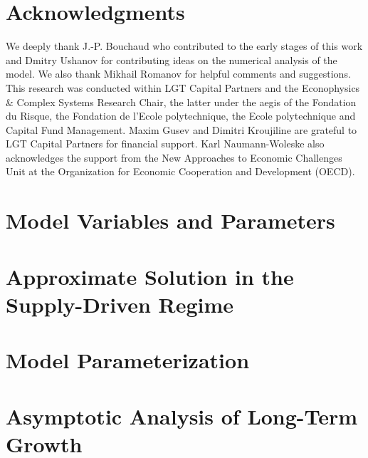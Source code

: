 \documentclass[authoryear, review]{elsarticle}
\begin{document}
\section{Acknowledgments}
\label{sec_ack}
We deeply thank J.-P. Bouchaud who contributed to the early stages of this work and Dmitry Ushanov for contributing ideas on the numerical analysis of the model. We also thank Mikhail Romanov for helpful comments and suggestions. This research was conducted within LGT Capital Partners and the Econophysics \& Complex Systems Research Chair, the latter under the aegis of the Fondation du Risque, the Fondation de l’Ecole polytechnique, the Ecole polytechnique and Capital Fund Management. Maxim Gusev and Dimitri Kroujiline are grateful to LGT Capital Partners for financial support. Karl Naumann-Woleske also acknowledges the support from the New Approaches to Economic Challenges Unit at the Organization for Economic Cooperation and Development (OECD).  


\newpage



\appendix
\section{Model Variables and Parameters}\label{appx_notation}


\section{Approximate Solution in the Supply-Driven Regime}\label{appx_boundarylayer}


\section{Model Parameterization}\label{appx_parameters}


\section{Asymptotic Analysis of Long-Term Growth}\label{appx_asymp_derivation}


%
\end{document}
